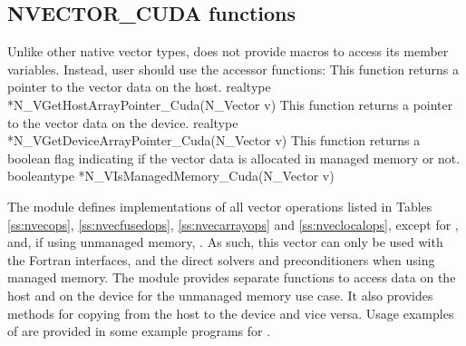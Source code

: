 \subsection{NVECTOR\_CUDA functions}
\label{ss:nvec_cuda_functions}

Unlike other native {\sundials} vector types, {\nveccuda} does not provide macros
to access its member variables. Instead, user should use the accessor functions:
{
  This function returns a pointer to the vector data on the host.
}
{
  realtype *N\_VGetHostArrayPointer\_Cuda(N\_Vector v)
}
{
  This function returns a pointer to the vector data on the device.
}
{
  realtype *N\_VGetDeviceArrayPointer\_Cuda(N\_Vector v)
}
{
  This function returns a boolean flag indicating if the vector
  data is allocated in managed memory or not.
}
{
  booleantype *N\_VIsManagedMemory\_Cuda(N\_Vector v)
}

The {\nveccuda} module defines implementations of all vector operations listed
in Tables \ref{ss:nvecops}, \ref{ss:nvecfusedops}, \ref{ss:nvecarrayops}
and \ref{ss:nveclocalops}, except for , and,
if using unmanaged memory, .
As such, this vector can only be used with the {\sundials} Fortran interfaces,
and the {\sundials} direct solvers and preconditioners when using managed memory.
The {\nveccuda} module provides separate functions to access data on the host
and on the device for the unmanaged memory use case. It also provides methods
for copying from the host to the device and vice versa. Usage examples of
{\nveccuda} are provided in some example programs for {\cvode} \cite{cvode_ex}.

